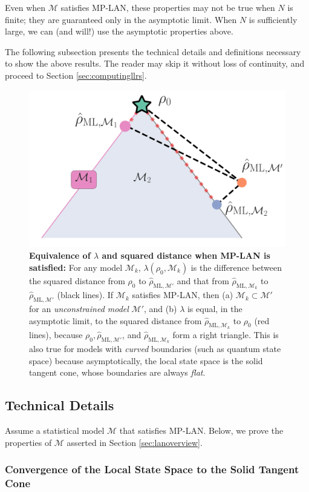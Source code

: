 \documentclass[aps,pra, twocolumn]{revtex4-1}
\newcommand{\M}{\mathcal{M}}
\newcommand{\rhohat}{\hat{\rho}}
\newcommand{\rhoML}[1]{\rhohat_{\scriptscriptstyle{\mathrm{ML},#1}}}
\begin{document}
Even when $\M$ satisfies MP-LAN, these properties may not be true when $N$ is finite; they are guaranteed only in the asymptotic limit. When $N$ is sufficiently large, we can (and will!) use the asymptotic properties above.

The following subsection presents the technical details and definitions necessary to show the above results. The reader may skip it without loss of continuity, and proceed to Section \ref{sec:computingllrs}.

\begin{figure}
\includegraphics[width=.75\columnwidth]{Images/Figure_3.pdf}
 \caption{\textbf{Equivalence of $\lambda$ and squared distance when MP-LAN is satisfied:} For any model $\M_{k}$, $\lambda(\rho_{0}, \M_{k})$ is the difference between the squared distance from $\rho_{0}$ to $\rhoML{\M'}$ and that from $\rhoML{\M_{k}}$ to $\rhoML{\M'}$ (black lines). If $\M_{k}$ satisfies MP-LAN, then (a) $\M_{k} \subset \M'$ for an \emph{unconstrained model} $\M'$, and (b) $\lambda$ is equal, in the asymptotic limit, to the squared distance from $\rhoML{\M_{k}}$ to $\rho_{0}$ (red lines), because $\rho_{0}, \rhoML{\M'}$, and $\rhoML{\M_{k}}$ form a right triangle. This is also true for models with \emph{curved} boundaries (such as quantum state space) because asymptotically, the local state space is the solid tangent cone, whose boundaries are always \emph{flat}.}
\label{fig:llrs_MP-LAN}
\end{figure}

\subsection{Technical Details}

Assume a statistical model $\M$ that satisfies MP-LAN. Below, we prove the properties of $\M$ asserted in Section \ref{sec:lanoverview}. 

\subsubsection{Convergence of the Local State Space to the Solid Tangent Cone}
\end{document}
